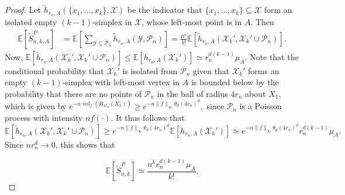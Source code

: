 \documentclass{amsart}
\theoremstyle{definition}
\newcommand{\E}{\mathbb{E}}
\newcommand{\vol}{\mathop{\mathrm{vol}}}
\newcommand{\X}{\mathcal{X}}
\newcommand{\Y}{\mathcal{Y}}
\newcommand{\s}{\widetilde{S}}
\newcommand{\p}{\mathcal{P}}
\renewcommand{\1}{\mathbb{1}}
\newcommand{\h}{\tilde{h}}
\begin{document}
\begin{proof}
Let $\h_{r_n,A}(\{x_1,\ldots, x_k\},\X)$ be the indicator that
$\{x_1,\ldots,x_k\}\subseteq\X$ form an isolated empty $(k-1)$-simplex in
$\X$, whose left-most point is in $A$.  Then
\begin{equation}\begin{split}\label{mean-unPoisson}
\E[\s_{n,k,A}^P]&=\E\left[\sum_{\Y\subseteq\p_\lambda}\h_{r_n,A}(\Y,\p_n)\right]
=\frac{n^k}{k!}\E\left[\h_{r_n,A}(\X_k',\X_k'\cup\p_n)\right].
\end{split}\end{equation}
Now, $\E\left[\h_{r_n,A}(\X_k',\X_k'\cup\p_n)\right]\le\E\left[h_{r_n,A}(\X_k')
\right]\simeq r_n^{d(k-1)}\mu_A$.  Note that the conditional probability that
$\X_k'$ is isolated from $\p_n$ given that $\X_k'$ forms an empty 
$(k-1)$-simplex with left-most vertex in $A$
is bounded below by the probability that there are no points of $\p_n$ in
the ball of radius $4r_n$ about $X_1$, which is given by $e^{-n\vol_f(B_{4r_n}(X_1)
)}\ge e^{-n\|f\|_\infty\theta_d(4r_n)^d},$ since $\p_n$ is a Poisson 
process with intensity $nf(\cdot)$.  It thus follows that 
$$ \E\left[\h_{r_n,A}(\X_k',\X_k'\cup\p_n)\right]\ge e^{-n\|f\|_\infty\theta_d(4r_n)^d}
\E[h_{r_n,A}(\X_k')]\simeq e^{-n\|f\|_\infty\theta_d(4r_n)^d}r_n^{d(k-1)}\mu_A.$$
Since $nr_n^d\to0$, this shows that

\begin{equation*}
\E[\s_{n,k}^P]\simeq \frac{n^kr_n^{d(k-1)}\mu_A}{k!}.\end{equation*}


\end{proof}
\end{document}
